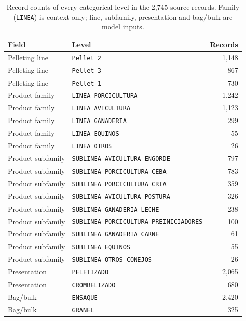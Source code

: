 \begin{table}[!htbp]\centering\footnotesize
\caption{Record counts of every categorical level in the 2,745 source records. Family (\texttt{LINEA}) is context only; line, subfamily, presentation and bag/bulk are model inputs.}\label{tab:s_categories}
\begin{tabular}{@{}llr@{}}\toprule
Field & Level & Records \\\midrule
Pelleting line & \texttt{Pellet 2} & 1,148 \\
Pelleting line & \texttt{Pellet 3} & 867 \\
Pelleting line & \texttt{Pellet 1} & 730 \\
Product family & \texttt{LINEA PORCICULTURA} & 1,242 \\
Product family & \texttt{LINEA AVICULTURA} & 1,123 \\
Product family & \texttt{LINEA GANADERIA} & 299 \\
Product family & \texttt{LINEA EQUINOS} & 55 \\
Product family & \texttt{LINEA OTROS} & 26 \\
Product subfamily & \texttt{SUBLINEA AVICULTURA ENGORDE} & 797 \\
Product subfamily & \texttt{SUBLINEA PORCICULTURA CEBA} & 783 \\
Product subfamily & \texttt{SUBLINEA PORCICULTURA CRIA} & 359 \\
Product subfamily & \texttt{SUBLINEA AVICULTURA POSTURA} & 326 \\
Product subfamily & \texttt{SUBLINEA GANADERIA LECHE} & 238 \\
Product subfamily & \texttt{SUBLINEA PORCICULTURA PREINICIADORES} & 100 \\
Product subfamily & \texttt{SUBLINEA GANADERIA CARNE} & 61 \\
Product subfamily & \texttt{SUBLINEA EQUINOS} & 55 \\
Product subfamily & \texttt{SUBLINEA OTROS CONEJOS} & 26 \\
Presentation & \texttt{PELETIZADO} & 2,065 \\
Presentation & \texttt{CROMBELIZADO} & 680 \\
Bag/bulk & \texttt{ENSAQUE} & 2,420 \\
Bag/bulk & \texttt{GRANEL} & 325 \\
\bottomrule
\end{tabular}
\end{table}
